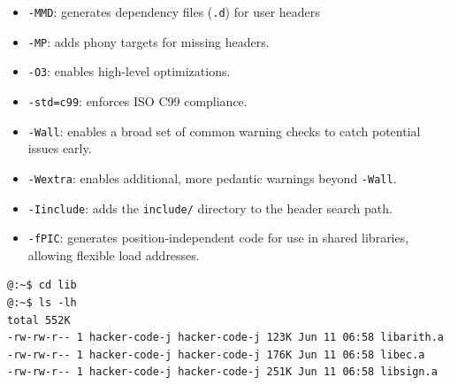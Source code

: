 \begin{itemize}
	\item \texttt{-MMD}: generates dependency files (\texttt{.d}) for user headers
	\item \texttt{-MP}: adds phony targets for missing headers.
	\item \texttt{-O3}: enables high-level optimizations.
	\item \texttt{-std=c99}: enforces ISO C99 compliance.
	\item \texttt{-Wall}: enables a broad set of common warning checks to catch potential issues early.
	\item \texttt{-Wextra}: enables additional, more pedantic warnings beyond \texttt{-Wall}.
	\item \texttt{-Iinclude}: adds the \texttt{include/} directory to the header search path.
	\item \texttt{-fPIC}: generates position-independent code for use in shared libraries, allowing flexible load addresses.
\end{itemize}
\begin{lstlisting}[numbers=none]
@:~$ cd lib
@:~$ ls -lh 
total 552K
-rw-rw-r-- 1 hacker-code-j hacker-code-j 123K Jun 11 06:58 libarith.a
-rw-rw-r-- 1 hacker-code-j hacker-code-j 176K Jun 11 06:58 libec.a
-rw-rw-r-- 1 hacker-code-j hacker-code-j 251K Jun 11 06:58 libsign.a
\end{lstlisting}
\newpage
